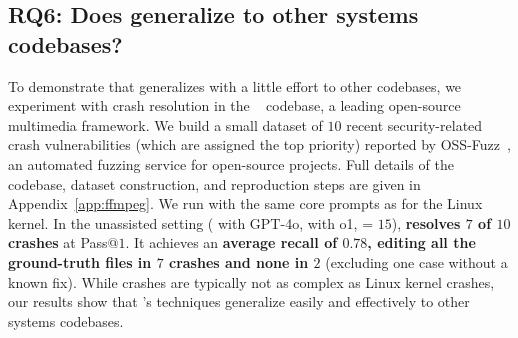 \subsection{RQ6: Does \cresearcher{} generalize to other systems codebases?}%
\label{sec:rq6}
To demonstrate that \cresearcher{} generalizes with a little effort to other codebases, we experiment with crash resolution in the \ffmpeg{}~\citep{ffmpeg} codebase, a leading open-source multimedia framework. We build a small dataset of $10$ recent security-related crash vulnerabilities (which are assigned the top priority) reported by OSS-Fuzz~\citep{ossfuzz}, an automated fuzzing service for open-source projects. Full details of the codebase, dataset construction, and reproduction steps are given in Appendix~\ref{app:ffmpeg}.
We run \cresearcher{} with the same core prompts as for the Linux kernel. 
In the unassisted setting (\analysisphase{} with GPT-4o, \synthesisphase{} with o1, \maxcalls{} = $15$), \cresearcher{} \textbf{resolves $7$ of $10$ crashes} at Pass@$1$. 
It achieves an \textbf{average recall of $0.78$, editing all the ground-truth files in $7$ crashes and none in $2$} (excluding one case without a known fix). 
While \ffmpeg{} crashes are typically not as complex as Linux kernel crashes, our results show that \cresearcher{}’s techniques generalize easily and effectively to other systems codebases.
